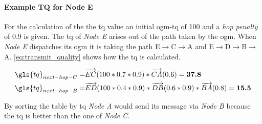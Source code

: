 \paragraph{Example TQ for Node E}
For the calculation of the the \gls{tq} value an initial \gls{ogm}-\gls{tq} of 100 and a \textit{hop penalty} of 0.9 is given.
The \gls{tq} of \textit{Node E} arises out of the path taken by the \gls{ogm}.
When \textit{Node E} dispatches its \gls{ogm} it is taking the path E$\rightarrow$C$\rightarrow$A and E$\rightarrow$D$\rightarrow$B$\rightarrow$A. \vref{eq:transmit_quality} shows how the \gls{tq} is calculated.

\begin{equation}
\label{eq:transmit_quality}
\begin{aligned}
\gls{tq} _{next-hop-C} = & \overrightarrow{EC} (100 * 0.7 * 0.9) * \overrightarrow{CA} (0.6) = \textbf{37.8} \\
\gls{tq} _{next-hop-B} = & \overrightarrow{ED} (100 * 0.4 * 0.9) * \overrightarrow{DB} (0.6 * 0.9) * \overrightarrow{BA} (0.8) = \textbf{15.5}
\end{aligned}
\end{equation}

By sorting the table by \gls{tq} \textit{Node A} would send its message via \textit{Node B} because the \gls{tq} is better than the one of \textit{Node C}.
